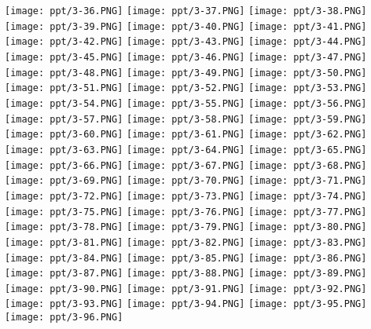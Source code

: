 \documentclass[UTF-8]{ctexart}
\begin{document}
\begin{center}
\texttt{[image: ppt/3-36.PNG]}
\texttt{[image: ppt/3-37.PNG]}
\texttt{[image: ppt/3-38.PNG]}
\texttt{[image: ppt/3-39.PNG]}
\texttt{[image: ppt/3-40.PNG]}
\texttt{[image: ppt/3-41.PNG]}
\texttt{[image: ppt/3-42.PNG]}
\texttt{[image: ppt/3-43.PNG]}
\texttt{[image: ppt/3-44.PNG]}
\texttt{[image: ppt/3-45.PNG]}
\texttt{[image: ppt/3-46.PNG]}
\texttt{[image: ppt/3-47.PNG]}
\texttt{[image: ppt/3-48.PNG]}
\texttt{[image: ppt/3-49.PNG]}
\texttt{[image: ppt/3-50.PNG]}
\texttt{[image: ppt/3-51.PNG]}
\texttt{[image: ppt/3-52.PNG]}
\texttt{[image: ppt/3-53.PNG]}
\texttt{[image: ppt/3-54.PNG]}
\texttt{[image: ppt/3-55.PNG]}
\texttt{[image: ppt/3-56.PNG]}
\texttt{[image: ppt/3-57.PNG]}
\texttt{[image: ppt/3-58.PNG]}
\texttt{[image: ppt/3-59.PNG]}
\texttt{[image: ppt/3-60.PNG]}
\texttt{[image: ppt/3-61.PNG]}
\texttt{[image: ppt/3-62.PNG]}
\texttt{[image: ppt/3-63.PNG]}
\texttt{[image: ppt/3-64.PNG]}
\texttt{[image: ppt/3-65.PNG]}
\texttt{[image: ppt/3-66.PNG]}
\texttt{[image: ppt/3-67.PNG]}
\texttt{[image: ppt/3-68.PNG]}
\texttt{[image: ppt/3-69.PNG]}
\texttt{[image: ppt/3-70.PNG]}
\texttt{[image: ppt/3-71.PNG]}
\texttt{[image: ppt/3-72.PNG]}
\texttt{[image: ppt/3-73.PNG]}
\texttt{[image: ppt/3-74.PNG]}
\texttt{[image: ppt/3-75.PNG]}
\texttt{[image: ppt/3-76.PNG]}
\texttt{[image: ppt/3-77.PNG]}
\texttt{[image: ppt/3-78.PNG]}
\texttt{[image: ppt/3-79.PNG]}
\texttt{[image: ppt/3-80.PNG]}
\texttt{[image: ppt/3-81.PNG]}
\texttt{[image: ppt/3-82.PNG]}
\texttt{[image: ppt/3-83.PNG]}
\texttt{[image: ppt/3-84.PNG]}
\texttt{[image: ppt/3-85.PNG]}
\texttt{[image: ppt/3-86.PNG]}
\texttt{[image: ppt/3-87.PNG]}
\texttt{[image: ppt/3-88.PNG]}
\texttt{[image: ppt/3-89.PNG]}
\texttt{[image: ppt/3-90.PNG]}
\texttt{[image: ppt/3-91.PNG]}
\texttt{[image: ppt/3-92.PNG]}
\texttt{[image: ppt/3-93.PNG]}
\texttt{[image: ppt/3-94.PNG]}
\texttt{[image: ppt/3-95.PNG]}
\texttt{[image: ppt/3-96.PNG]}

\end{center}
\end{document}
